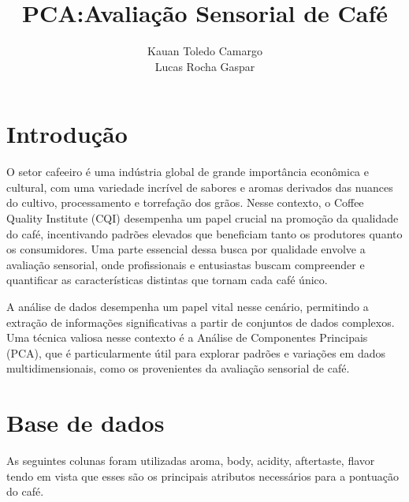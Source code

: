 \documentclass{article}
\title{PCA:Avaliação Sensorial de Café}
\author{
    Kauan Toledo Camargo\\
    Lucas Rocha Gaspar\\
}
\date{}
\begin{document}
\maketitle

\section{Introdução}

O setor cafeeiro é uma indústria global de grande importância econômica e cultural, com uma variedade incrível de sabores e aromas derivados das nuances do cultivo, processamento e torrefação dos grãos. Nesse contexto, o Coffee Quality Institute (CQI) desempenha um papel crucial na promoção da qualidade do café, incentivando padrões elevados que beneficiam tanto os produtores quanto os consumidores. Uma parte essencial dessa busca por qualidade envolve a avaliação sensorial, onde profissionais e entusiastas buscam compreender e quantificar as características distintas que tornam cada café único.

A análise de dados desempenha um papel vital nesse cenário, permitindo a extração de informações significativas a partir de conjuntos de dados complexos. Uma técnica valiosa nesse contexto é a Análise de Componentes Principais (PCA), que é particularmente útil para explorar padrões e variações em dados multidimensionais, como os provenientes da avaliação sensorial de café.

\section{Base de dados}

As seguintes colunas foram utilizadas aroma, body, acidity, aftertaste, flavor tendo em vista que esses são os principais atributos necessários para a pontuação do café.
\end{document}
